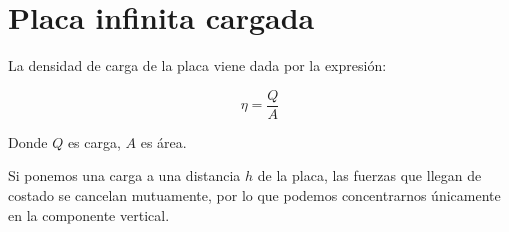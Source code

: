 \section{Placa infinita cargada}

La densidad de carga de la placa viene dada por la expresión:

\vspace{3cm}
\begin{equation*}
    \eta = \frac{Q}{A}
\end{equation*}
\vspace{3cm}

Donde \(Q\) es carga,
\(A\) es área.

Si ponemos una carga a una distancia \(h\) de la placa,
las fuerzas que llegan de costado se cancelan mutuamente,
por lo que podemos concentrarnos únicamente en la componente vertical.